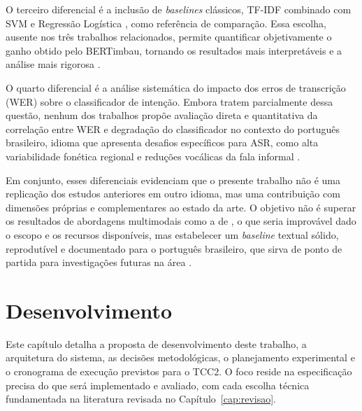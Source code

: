 \documentclass[
    12pt,                %
    openright,           %
    oneside,             %
    a4paper,             %
    english,             %
    brazil               %
]{abntex2}
\begin{document}
O terceiro diferencial é a inclusão de \textit{baselines} clássicos, TF-IDF combinado com SVM e Regressão Logística \cite{Manning2008}, como referência de comparação. Essa escolha, ausente nos três trabalhos relacionados, permite quantificar objetivamente o ganho obtido pelo BERTimbau, tornando os resultados mais interpretáveis e a análise mais rigorosa \cite{Weld2022}.

O quarto diferencial é a análise sistemática do impacto dos erros de transcrição (WER) sobre o classificador de intenção. Embora  tratem parcialmente dessa questão, nenhum dos trabalhos propõe avaliação direta e quantitativa da correlação entre WER e degradação do classificador no contexto do português brasileiro, idioma que apresenta desafios específicos para ASR, como alta variabilidade fonética regional e reduções vocálicas da fala informal \cite{CORAA2023, Bevilacqua2024}.

Em conjunto, esses diferenciais evidenciam que o presente trabalho não é uma replicação dos estudos anteriores em outro idioma, mas uma contribuição com dimensões próprias e complementares ao estado da arte. O objetivo não é superar os resultados de abordagens multimodais como a de , o que seria improvável dado o escopo e os recursos disponíveis, mas estabelecer um \textit{baseline} textual sólido, reprodutível e documentado para o português brasileiro, que sirva de ponto de partida para investigações futuras na área \cite{Wazlawick2020, Dighe2024}.


\chapter{Desenvolvimento}
\label{cap:desenvolvimento}

Este capítulo detalha a proposta de desenvolvimento deste trabalho, a arquitetura do sistema, as decisões metodológicas, o planejamento experimental e o cronograma de execução previstos para o TCC2. O foco reside na especificação precisa do que será implementado e avaliado, com cada escolha técnica fundamentada na literatura revisada no Capítulo~\ref{cap:revisao}.

\end{document}
